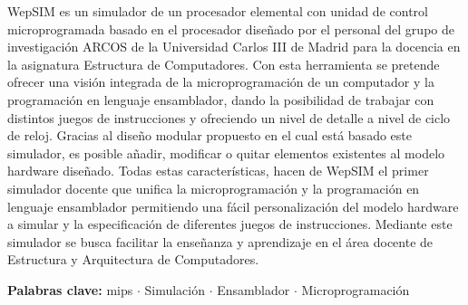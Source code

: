 % 
% 
%
\thispagestyle{plain}

WepSIM es un simulador de un procesador elemental con unidad de control microprogramada basado en el procesador diseñado por el personal del grupo de investigación ARCOS de la Universidad Carlos III de Madrid para la docencia en la asignatura Estructura de Computadores. Con esta herramienta se pretende ofrecer una visión integrada de la microprogramación de un computador y la programación en lenguaje ensamblador, dando la posibilidad de trabajar con distintos juegos de instrucciones y ofreciendo un nivel de detalle a nivel de ciclo de reloj. Gracias al diseño modular propuesto en el cual está basado este simulador, es posible añadir, modificar o quitar elementos existentes al modelo hardware diseñado. Todas estas características, hacen de WepSIM el primer simulador docente que unifica la microprogramación y la programación en lenguaje ensamblador permitiendo una fácil personalización del modelo hardware a simular y la especificación de diferentes juegos de instrucciones. Mediante este simulador se busca facilitar la enseñanza y aprendizaje en el área docente de Estructura y Arquitectura de Computadores.
\vspace{0.7cm}

\textbf{Palabras clave:} \acrshort{mips} $\cdot$ Simulación $\cdot$ Ensamblador $\cdot$ Microprogramación
